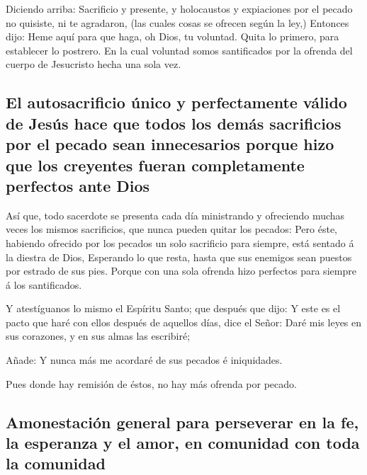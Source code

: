  Diciendo arriba: Sacrificio y presente, y holocaustos y
expiaciones por el pecado no quisiste, ni te agradaron, (las cuales
cosas se ofrecen según la ley,)  Entonces dijo: Heme aquí
para que haga, oh Dios, tu voluntad. Quita lo primero, para establecer
lo postrero.  En la cual voluntad somos santificados por
la ofrenda del cuerpo de Jesucristo hecha una sola vez.

\hypertarget{el-autosacrificio-uxfanico-y-perfectamente-vuxe1lido-de-jesuxfas-hace-que-todos-los-demuxe1s-sacrificios-por-el-pecado-sean-innecesarios-porque-hizo-que-los-creyentes-fueran-completamente-perfectos-ante-dios}{%
\subsection{El autosacrificio único y perfectamente válido de Jesús hace
que todos los demás sacrificios por el pecado sean innecesarios porque
hizo que los creyentes fueran completamente perfectos ante
Dios}\label{el-autosacrificio-uxfanico-y-perfectamente-vuxe1lido-de-jesuxfas-hace-que-todos-los-demuxe1s-sacrificios-por-el-pecado-sean-innecesarios-porque-hizo-que-los-creyentes-fueran-completamente-perfectos-ante-dios}}

 Así que, todo sacerdote se presenta cada día ministrando
y ofreciendo muchas veces los mismos sacrificios, que nunca pueden
quitar los pecados:  Pero éste, habiendo ofrecido por los
pecados un solo sacrificio para siempre, está sentado á la diestra de
Dios,  Esperando lo que resta, hasta que sus enemigos
sean puestos por estrado de sus pies.  Porque con una
sola ofrenda hizo perfectos para siempre á los santificados.

 Y atestíguanos lo mismo el Espíritu Santo; que después
que dijo:  Y este es el pacto que haré con ellos después
de aquellos días, dice el Señor: Daré mis leyes en sus corazones, y en
sus almas las escribiré;

 Añade: Y nunca más me acordaré de sus pecados é
iniquidades.

 Pues donde hay remisión de éstos, no hay más ofrenda por
pecado.

\hypertarget{amonestaciuxf3n-general-para-perseverar-en-la-fe-la-esperanza-y-el-amor-en-comunidad-con-toda-la-comunidad}{%
\subsection{Amonestación general para perseverar en la fe, la esperanza
y el amor, en comunidad con toda la
comunidad}\label{amonestaciuxf3n-general-para-perseverar-en-la-fe-la-esperanza-y-el-amor-en-comunidad-con-toda-la-comunidad}}

